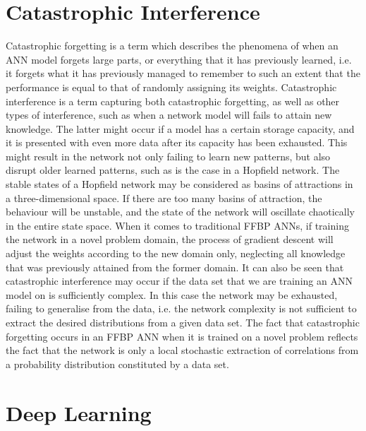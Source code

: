 \section{Catastrophic Interference}

Catastrophic forgetting \cite{McCloskey1989} is a term which describes the phenomena of when an ANN model forgets large parts, or everything that it has previously learned, i.e. it forgets what it has previously managed to remember to such an extent that the performance is equal to that of randomly assigning its weights. Catastrophic interference is a term capturing both catastrophic forgetting, as well as other types of interference, such as when a network model will fails to attain new knowledge. The latter might occur if a model has a certain storage capacity, and it is presented with even more data after its capacity has been exhausted. This might result in the network not only failing to learn new patterns, but also disrupt older learned patterns, such as is the case in a Hopfield network. The stable states of a Hopfield network may be considered as basins of attractions in a three-dimensional space. If there are too many basins of attraction, the behaviour will be unstable, and the state of the network will oscillate chaotically in the entire state space.
When it comes to traditional FFBP ANNs, if training the network in a novel problem domain, the process of gradient descent will adjust the weights according to the new domain only, neglecting all knowledge that was previously attained from the former domain.
It can also be seen that catastrophic interference may occur if the data set that we are training an ANN model on is sufficiently complex. In this case the network may be exhausted, failing to generalise from the data, i.e. the network complexity is not sufficient to extract the desired distributions from a given data set. 
The fact that catastrophic forgetting occurs in an FFBP ANN when it is trained on a novel problem reflects the fact that the network is only a local stochastic extraction of correlations from a probability distribution constituted by a data set.

\section{Deep Learning}

